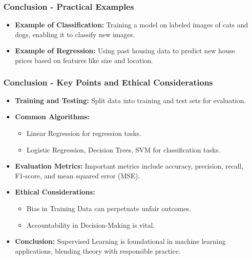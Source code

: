 \documentclass[aspectratio=169]{beamer}
\begin{document}
\begin{frame}[fragile]
    \frametitle{Conclusion - Practical Examples}

    \begin{itemize}
        \item \textbf{Example of Classification:} 
        Training a model on labeled images of cats and dogs, enabling it to classify new images.
        
        \item \textbf{Example of Regression:} 
        Using past housing data to predict new house prices based on features like size and location.
    \end{itemize}
\end{frame}

\begin{frame}[fragile]
    \frametitle{Conclusion - Key Points and Ethical Considerations}

    \begin{itemize}
        \item \textbf{Training and Testing:}
        Split data into training and test sets for evaluation.
        
        \item \textbf{Common Algorithms:}
        \begin{itemize}
            \item Linear Regression for regression tasks.
            \item Logistic Regression, Decision Trees, SVM for classification tasks.
        \end{itemize}
        
        \item \textbf{Evaluation Metrics:}
        Important metrics include accuracy, precision, recall, F1-score, and mean squared error (MSE).
        
        \item \textbf{Ethical Considerations:}
        \begin{itemize}
            \item Bias in Training Data can perpetuate unfair outcomes.
            \item Accountability in Decision-Making is vital.
        \end{itemize}
        
        \item \textbf{Conclusion:}
        Supervised Learning is foundational in machine learning applications, blending theory with responsible practice.
    \end{itemize}
\end{frame}
\end{document}
